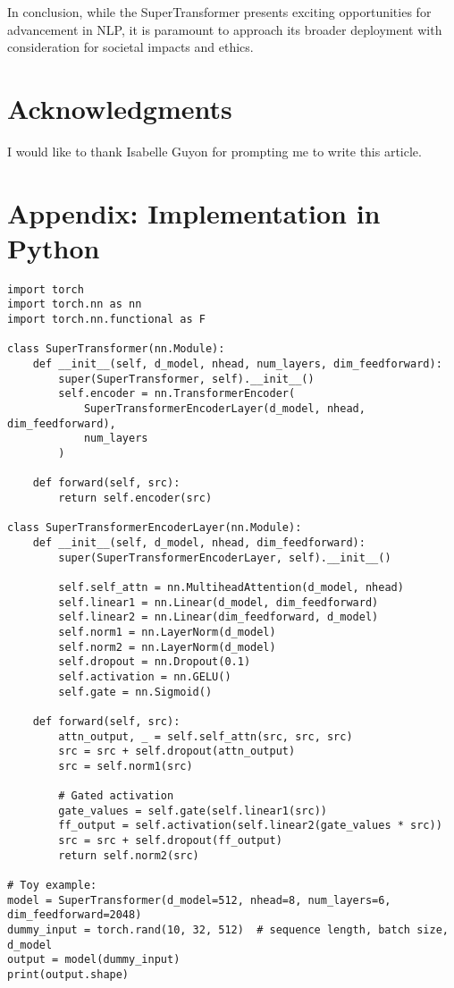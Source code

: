 \documentclass{article}
\begin{document}
In conclusion, while the SuperTransformer presents exciting opportunities for advancement in NLP, it is paramount to approach its broader deployment with consideration for societal impacts and ethics.

\section*{Acknowledgments}
I would like to thank Isabelle Guyon for prompting me to write this article.




\section{Appendix: Implementation in Python}

\begin{verbatim}
import torch
import torch.nn as nn
import torch.nn.functional as F

class SuperTransformer(nn.Module):
    def __init__(self, d_model, nhead, num_layers, dim_feedforward):
        super(SuperTransformer, self).__init__()
        self.encoder = nn.TransformerEncoder(
            SuperTransformerEncoderLayer(d_model, nhead, dim_feedforward),
            num_layers
        )
        
    def forward(self, src):
        return self.encoder(src)

class SuperTransformerEncoderLayer(nn.Module):
    def __init__(self, d_model, nhead, dim_feedforward):
        super(SuperTransformerEncoderLayer, self).__init__()
        
        self.self_attn = nn.MultiheadAttention(d_model, nhead)
        self.linear1 = nn.Linear(d_model, dim_feedforward)
        self.linear2 = nn.Linear(dim_feedforward, d_model)
        self.norm1 = nn.LayerNorm(d_model)
        self.norm2 = nn.LayerNorm(d_model)
        self.dropout = nn.Dropout(0.1)
        self.activation = nn.GELU()
        self.gate = nn.Sigmoid()

    def forward(self, src):
        attn_output, _ = self.self_attn(src, src, src)
        src = src + self.dropout(attn_output)
        src = self.norm1(src)

        # Gated activation
        gate_values = self.gate(self.linear1(src))
        ff_output = self.activation(self.linear2(gate_values * src))
        src = src + self.dropout(ff_output)
        return self.norm2(src)

# Toy example:
model = SuperTransformer(d_model=512, nhead=8, num_layers=6, dim_feedforward=2048)
dummy_input = torch.rand(10, 32, 512)  # sequence length, batch size, d_model
output = model(dummy_input)
print(output.shape)    
\end{verbatim}
\end{document}
